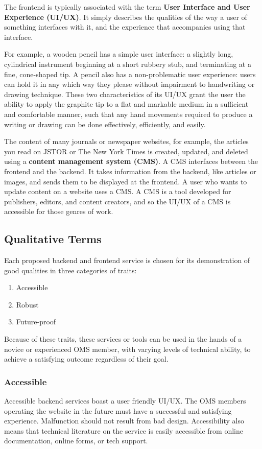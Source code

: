 The frontend is typically associated with the term \textbf{User Interface and User Experience (UI/UX)}. It simply describes the qualities of the way a user of something interfaces with it, and the experience that accompanies using that interface.

For example, a wooden pencil has a simple user interface: a slightly long, cylindrical instrument beginning at a short rubbery stub, and terminating at a fine, cone-shaped tip. A pencil also has a non-problematic user experience: users can hold it in any which way they please without impairment to handwriting or drawing technique. These two characteristics of its UI/UX grant the user the ability to apply the graphite tip to a flat and markable medium in a sufficient and comfortable manner, such that any hand movements required to produce a writing or drawing can be done effectively, efficiently, and easily.

The content of many journals or newspaper websites, for example, the articles you read on JSTOR or The New York Times is created, updated, and deleted using a \textbf{content management system (CMS)}. A CMS interfaces between the frontend and the backend. It takes information from the backend, like articles or images, and sends them to be displayed at the frontend. A user who wants to update content on a website uses a CMS\@. A CMS is a tool developed for publishers, editors, and content creators, and so the UI/UX of a CMS is accessible for those genres of work.

\subsection{Qualitative Terms}
Each proposed backend and frontend service is chosen for its demonstration of good qualities in three categories of traits:

\begin{enumerate}
    \item Accessible
    \item Robust
    \item Future-proof
\end{enumerate}

Because of these traits, these services or tools can be used in the hands of a novice or experienced OMS member, with varying levels of technical ability, to achieve a satisfying outcome regardless of their goal.

\subsubsection*{Accessible}
Accessible backend services boast a user friendly UI/UX\@. The OMS members operating the website in the future must have a successful and satisfying experience. Malfunction should not result from bad design. Accessibility also means that technical literature on the service is easily accessible from online documentation, online forms, or tech support.


